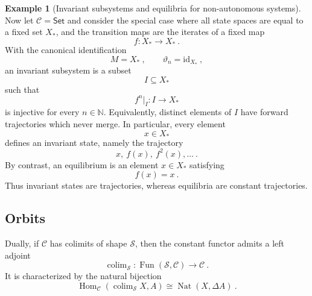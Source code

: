 \documentclass[a4paper,reqno,oneside]{amsart}
\theoremstyle{definition}
\newtheorem{example}[theorem]{Example}
\theoremstyle{remark}
\newcommand{\N}{\mathbb{N}}
\renewcommand{\theta}{\vartheta}
\newcommand{\id}{\mathrm{id}}
\numberwithin{equation}{section}
\begin{document}
\begin{example}[Invariant subsystems and equilibria for non-autonomous systems]
		Now let $\mathcal C=\mathsf{Set}$ and consider the special case where all state spaces are equal to a fixed set $X_*$, and the transition maps are the iterates of a fixed map
		\begin{equation}
			f\colon X_*\longrightarrow X_* \ .
		\end{equation}
		With the canonical identification
		\begin{equation}
			M=X_* \ ,
			\qquad
			\theta_n=\id_{X_*} \ ,
		\end{equation}
		an invariant subsystem is a subset
		\begin{equation}
			I\subseteq X_*
		\end{equation}
		such that
		\begin{equation}
			f^n|_I\colon I\longrightarrow X_*
		\end{equation}
		is injective for every $n\in\N$. Equivalently, distinct elements of $I$
		have forward trajectories which never merge. In particular, every element
		\begin{equation}
			x\in X_*
		\end{equation}
		defines an invariant state, namely the trajectory
		\begin{equation}
			x,\ f(x),\ f^2(x),\ldots \ .
		\end{equation}
		By contrast, an equilibrium is an element $x\in X_*$
		satisfying
		\begin{equation}
			f(x)=x \ .
		\end{equation}
		Thus invariant states are trajectories, whereas equilibria are constant trajectories.
	\end{example}
	
	
	
	
	
	
	
	
	\subsection{Orbits}
	
	Dually, if $\mathcal C$ has colimits of shape $\mathcal S$, then the
	constant functor admits a left adjoint
	\begin{equation}
		\operatorname{colim}_{\mathcal S}\colon
		\operatorname{Fun}(\mathcal S,\mathcal C)\to\mathcal C \ .
	\end{equation}
	It is characterized by the natural bijection
	\begin{equation}
		\operatorname{Hom}_{\mathcal C}
		\left(\operatorname{colim}_{\mathcal S}X,A\right)
		\cong
		\operatorname{Nat}(X,\Delta A) \ .
	\end{equation}
	
\end{document}
